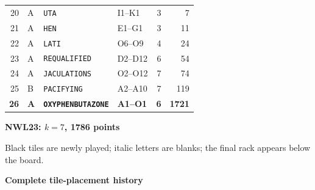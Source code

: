 \documentclass[letterpaper]{article}
\begin{document}
\begin{center}
\begin{tabular}{@{}rlllrr@{}}
20 & A & \texttt{UTA} & I1--K1 & 3 & 7\\
21 & A & \texttt{HEN} & E1--G1 & 3 & 11\\
22 & A & \texttt{LATI} & O6--O9 & 4 & 24\\
23 & A & \texttt{REQUALIFIED} & D2--D12 & 6 & 54\\
24 & A & \texttt{JACULATIONS} & O2--O12 & 7 & 74\\
25 & B & \texttt{PACIFYING} & A2--A10 & 7 & 119\\
\midrule
\textbf{26} & \textbf{A} & \textbf{\texttt{OXYPHENBUTAZONE}} & \textbf{A1--O1} & \textbf{6} & \textbf{1721}\\
\bottomrule\end{tabular}
\end{center}
\vfill
\clearpage
\begin{center}
{\fontsize{11}{12}\selectfont\bfseries NWL23: $k=7$, 1786 points\par}
\vspace{2pt}
\par
\vspace{1pt}
{\fontsize{7.2}{8}\selectfont Black tiles are newly played; italic letters are blanks; the final rack appears below the board.\par}
\vspace{2pt}
{\fontsize{8.5}{9}\selectfont\bfseries Complete tile-placement history\par}
\end{center}
\end{document}
